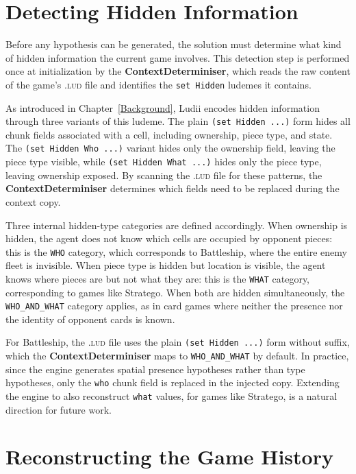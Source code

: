 \section{Detecting Hidden Information}
\label{sec:detect_hidden}

Before any hypothesis can be generated, the solution must determine what kind of hidden information the current game involves. This detection step is performed once at initialization by the \textbf{ContextDeterminiser}, which reads the raw content of the game's \textsc{.lud} file and identifies the \texttt{set Hidden} ludemes it contains.

As introduced in Chapter~\ref{Background}, Ludii encodes hidden information through three variants of this ludeme. The plain \texttt{(set Hidden ...)} form hides all chunk fields associated with a cell, including ownership, piece type, and state. The \texttt{(set Hidden Who ...)} variant hides only the ownership field, leaving the piece type visible, while \texttt{(set Hidden What ...)} hides only the piece type, leaving ownership exposed. By scanning the \textsc{.lud} file for these patterns, the \textbf{ContextDeterminiser} determines which fields need to be replaced during the context copy.

Three internal hidden-type categories are defined accordingly. When ownership is hidden, the agent does not know which cells are occupied by opponent pieces: this is the \texttt{WHO} category, which corresponds to Battleship, where the entire enemy fleet is invisible. When piece type is hidden but location is visible, the agent knows where pieces are but not what they are: this is the \texttt{WHAT} category, corresponding to games like Stratego. When both are hidden simultaneously, the \texttt{WHO\_AND\_WHAT} category applies, as in card games where neither the presence nor the identity of opponent cards is known.

For Battleship, the \textsc{.lud} file uses the plain \texttt{(set Hidden ...)} form without suffix, which the \textbf{ContextDeterminiser} maps to \texttt{WHO\_AND\_WHAT} by default. In practice, since the engine generates spatial presence hypotheses rather than type hypotheses, only the \texttt{who} chunk field is replaced in the injected copy. Extending the engine to also reconstruct \texttt{what} values, for games like Stratego, is a natural direction for future work.


\section{Reconstructing the Game History}
\label{sec:history_reconstruction}

